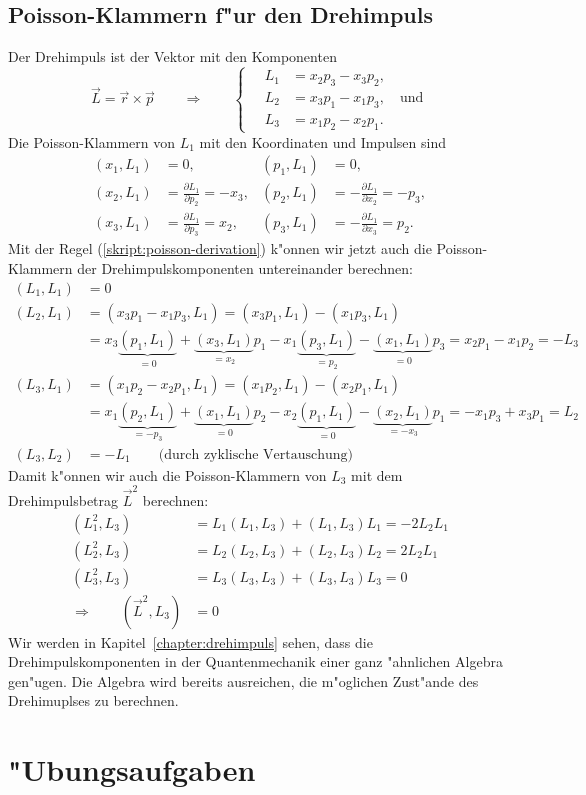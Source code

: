 \subsection{Poisson-Klammern f"ur den Drehimpuls}
Der Drehimpuls ist der Vektor mit den Komponenten
\[
\vec L=\vec r\times \vec p
\qquad\Rightarrow\qquad
\left\{\quad
\begin{aligned}
L_1&=x_2p_3-x_3p_2,\\
L_2&=x_3p_1-x_1p_3,\quad\text{und}\\
L_3&=x_1p_2-x_2p_1.
\end{aligned}
\right.
\]
Die Poisson-Klammern von $L_1$  mit den Koordinaten und Impulsen sind
\begin{align*}
(x_1,L_1)
&=
0,
&
(p_1,L_1)
&=
0,
\\
(x_2,L_1)
&=
\frac{\partial L_1}{\partial p_2}
=
-x_3,
&
(p_2,L_1)
&=
-\frac{\partial L_1}{\partial x_2}
=
-p_3,
\\
(x_3,L_1)
&=
\frac{\partial L_1}{\partial p_3}
=
x_2,
&
(p_3,L_1)
&=
-\frac{\partial L_1}{\partial x_3}
=
p_2.
\end{align*}
Mit der Regel (\ref{skript:poisson-derivation}) k"onnen wir jetzt auch die
Poisson-Klammern der Drehimpulskomponenten untereinander berechnen:
\begin{align*}
(L_1,L_1)&=0
\\
(L_2,L_1)
&=
(x_3p_1-x_1p_3,L_1)
=
(x_3p_1,L_1)-(x_1p_3,L_1)
\\
&=
x_3\underbrace{(p_1,L_1)}_{=0}+\underbrace{(x_3,L_1)}_{=x_2}p_1
-x_1\underbrace{(p_3,L_1)}_{=p_2} -\underbrace{(x_1,L_1)}_{=0}p_3
=
x_2p_1 -x_1p_2=-L_3
\\
(L_3,L_1)
&=
(x_1p_2-x_2p_1,L_1)
=
(x_1p_2,L_1)-(x_2p_1,L_1)
\\
&=
x_1\underbrace{(p_2,L_1)}_{=-p_3} + \underbrace{(x_1,L_1)}_{=0}p_2
- x_2\underbrace{(p_1,L_1)}_{=0} - \underbrace{(x_2,L_1)}_{=-x_3}p_1
=
-x_1p_3+x_3p_1
=L_2
\\
(L_3,L_2)&=-L_1\qquad\text{(durch zyklische Vertauschung)}
\end{align*}
Damit k"onnen wir auch die Poisson-Klammern von $L_3$ mit dem Drehimpulsbetrag
$\vec L^2$ berechnen:
\begin{align*}
(L_1^2,L_3)
&=
L_1(L_1,L_3)+(L_1,L_3)L_1
=
-2L_2L_1
\\
(L_2^2,L_3)
&=
L_2(L_2,L_3)+(L_2,L_3)L_2
=
2L_2L_1
\\
(L_3^2,L_3)&=L_3(L_3,L_3)+(L_3,L_3)L_3=0
\\
\Rightarrow\qquad
(\vec L^2,L_3)
&=0
\end{align*}
Wir werden in Kapitel~\ref{chapter:drehimpuls} sehen,
dass die Drehimpulskomponenten in der
Quantenmechanik einer ganz "ahnlichen Algebra gen"ugen.
Die Algebra wird bereits ausreichen, die m"oglichen Zust"ande
des Drehimuplses zu berechnen.


\section*{"Ubungsaufgaben}
\begin{uebungsaufgaben}
\item

\item

\item

\end{uebungsaufgaben}

